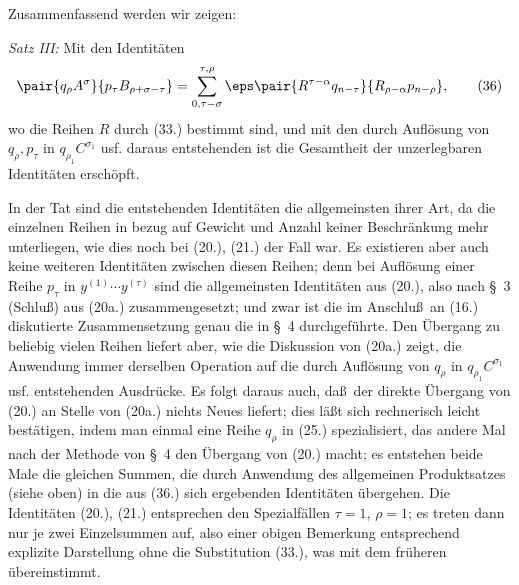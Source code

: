 Zusammenfassend werden wir zeigen:

\emph{Satz III:} Mit den Identit\"aten
\begin{equation}
 \pair{q_\rho A^\sigma}{p_\tau B_{\rho+\sigma-\tau}}
 =\sum_{\substack{0,\tau-\sigma}}^{\substack{\tau,\rho}}
 \eps\pair{R^{\tau-\alpha}q_{n-\tau}}{R_{\rho-\alpha}p_{n-\rho}},
\tag{36}
\end{equation}
wo die Reihen $R$ durch (33.) bestimmt sind, und mit den durch Aufl\"osung von $q_\rho,p_\tau$ in $q_{\rho_1}C^{\sigma_1}$ usf. daraus entstehenden ist die Gesamtheit der unzerlegbaren Identit\"aten ersch\"opft.

In der Tat sind die entstehenden Identit\"aten die allgemeinsten ihrer Art, da die einzelnen Reihen in bezug auf Gewicht und Anzahl keiner Beschr\"ankung mehr unterliegen, wie dies noch bei (20.), (21.) der Fall war. Es existieren aber auch keine weiteren Identit\"aten zwischen diesen Reihen; denn bei Aufl\"osung einer Reihe $p_\tau$ in $y^{(1)}\cdots y^{(\tau)}$ sind die allgemeinsten Identit\"aten aus (20.), also nach \S\ 3 (Schlu\ss) aus (20a.) zusammengesetzt; und zwar ist die im Anschlu\ss\ an (16.) diskutierte Zusammensetzung genau die in \S\ 4 durchgef\"uhrte. Den \"Ubergang zu beliebig vielen Reihen liefert aber, wie die Diskussion von (20a.) zeigt, die Anwendung immer derselben Operation auf die durch Aufl\"osung von $q_\rho$ in $q_{\rho_1}C^{\sigma_1}$ usf. entstehenden Ausdr\"ucke. Es folgt daraus auch, da\ss\ der direkte \"Ubergang von (20.) an Stelle von (20a.) nichts Neues liefert; dies l\"a\ss t sich rechnerisch leicht best\"atigen, indem man einmal eine Reihe $q_\rho$ in (25.) spezialisiert, das andere Mal nach der Methode von \S\ 4 den \"Ubergang von (20.) macht; es entstehen beide Male die gleichen Summen, die durch Anwendung des allgemeinen Produktsatzes (siehe oben) in die aus (36.) sich ergebenden Identit\"aten \"ubergehen. Die Identit\"aten (20.), (21.) entsprechen den Spezialf\"allen $\tau=1$, $\rho=1$; es treten dann nur je zwei Einzelsummen auf, also einer obigen Bemerkung entsprechend explizite Darstellung ohne die Substitution (33.), was mit dem fr\"uheren \"ubereinstimmt.

